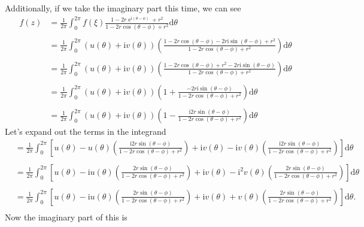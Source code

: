 \documentclass[10pt]{amsart}
\newcommand{\D}{\mathrm{d}}
\newcommand{\I}{\mathrm{i}}
\DeclareMathOperator{\E}{e}
\theoremstyle{nonumberplain}
\begin{document}
\begin{enumerate}[label={\bf {\arabic*}:}]
\noindent
Additionally, if we take the imaginary part this time, we can see
\begin{align*}
f(z) &= \frac 1 {2\pi} \int_0^{2\pi} f(\xi) \frac{1 - 2r \E^{\I (\theta - \phi)} + r^2}{1 - 2r \cos (\theta - \phi) + r^2} \D \theta \nonumber \\ \\
	&= \frac 1 {2\pi} \int_0^{2\pi} (u(\theta) + \I v(\theta))\left(\frac{1 - 2r \cos(\theta - \phi) -2r\I \sin(\theta - \phi) + r^2}{1 - 2r \cos (\theta - \phi) + r^2} \right) \D \theta \nonumber \\ \\
	&= \frac 1 {2\pi} \int_0^{2\pi} (u(\theta) + \I v(\theta))\left(\frac{1 - 2r \cos(\theta - \phi)  + r^2 -2r\I \sin(\theta - \phi)}{1 - 2r \cos (\theta - \phi) + r^2} \right) \D \theta \nonumber \\ \\
	&= \frac 1 {2\pi} \int_0^{2\pi} (u(\theta) + \I v(\theta))\left(1 + \frac{-2r\I \sin(\theta - \phi)}{1 - 2r \cos (\theta - \phi) + r^2} \right) \D \theta \nonumber \\ \\
	&= \frac 1 {2\pi} \int_0^{2\pi} (u(\theta) + \I v(\theta))\left(1 - \frac{\I 2r\sin(\theta - \phi)}{1 - 2r \cos (\theta - \phi) + r^2} \right) \D \theta
\end{align*}
Let's expand out the terms in the integrand
\begin{align*}
	&= \frac 1 {2\pi} \int_0^{2\pi} \left[
		u(\theta)
		- u(\theta)\left(\frac{\I 2r\sin(\theta - \phi)}{1 - 2r \cos (\theta - \phi) + r^2} \right)
		+ \I v(\theta)
		- \I v(\theta)\left(\frac{\I 2r\sin(\theta - \phi)}{1 - 2r \cos (\theta - \phi) + r^2} \right)
	\right] \D \theta \\ \\
	&= \frac 1 {2\pi} \int_0^{2\pi} \left[
		u(\theta)
		- \I u(\theta)\left(\frac{2r\sin(\theta - \phi)}{1 - 2r \cos (\theta - \phi) + r^2} \right)
		+ \I v(\theta)
		- \I^2 v(\theta)\left(\frac{2r\sin(\theta - \phi)}{1 - 2r \cos (\theta - \phi) + r^2} \right)
	\right] \D \theta \\ \\
	&= \frac 1 {2\pi} \int_0^{2\pi} \left[
		u(\theta)
		- \I u(\theta)\left(\frac{2r\sin(\theta - \phi)}{1 - 2r \cos (\theta - \phi) + r^2} \right)
		+ \I v(\theta)
		+ v(\theta)\left(\frac{2r\sin(\theta - \phi)}{1 - 2r \cos (\theta - \phi) + r^2} \right)
	\right] \D \theta. \\
\end{align*}
Now the imaginary part of this is

\end{enumerate}
\end{document}
